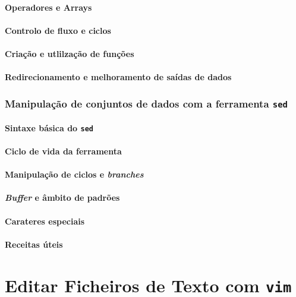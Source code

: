\documentclass[a4paper, onecolumn, 10pt]{report}
\begin{document}
\subsubsection{Operadores e Arrays}

\subsubsection{Controlo de fluxo e ciclos}

\subsubsection{Criação e utlilzação de funções}

\subsubsection{Redirecionamento e melhoramento de saídas de dados}

\subsection{Manipulação de conjuntos de dados com a ferramenta \texttt{sed}}

\subsubsection{Sintaxe básica do \texttt{sed}}

\subsubsection{Ciclo de vida da ferramenta}

\subsubsection{Manipulação de ciclos e \textit{branches}}

\subsubsection{\textit{Buffer} e âmbito de padrões}

\subsubsection{Carateres especiais}

\subsubsection{Receitas úteis}

\chapter{Editar Ficheiros de Texto com \texttt{vim}}

\tableofcontents

\newpage

\printacronyms[include-classes=abbrev, name=Acrónimos]
\end{document}
